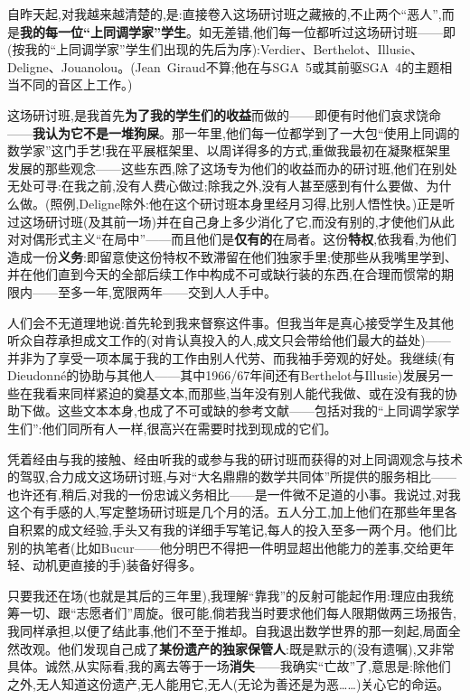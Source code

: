 自昨天起,对我越来越清楚的,是:直接卷入这场研讨班之藏掖的,不止两个“恶人”,而是\textbf{我的每一位“上同调学家”学生}。如无差错,他们每一位都听过这场研讨班——即(按我的“上同调学家”学生们出现的先后为序):Verdier、Berthelot、Illusie、Deligne、Jouanolou。(Jean~Giraud不算;他在与SGA~5或其前驱SGA~4的主题相当不同的音区上工作。)

这场研讨班,是我首先\textbf{为了我的学生们的收益}而做的——即便有时他们哀求饶命——\textbf{我认为它不是一堆狗屎}。那一年里,他们每一位都学到了一大包“使用上同调的数学家”这门手艺!我在平展框架里、以周详得多的方式,重做我最初在凝聚框架里发展的那些观念——这些东西,除了这场专为他们的收益而办的研讨班,他们在别处无处可寻:在我之前,没有人费心做过;除我之外,没有人甚至感到有什么要做、为什么做。(照例,Deligne除外:他在这个研讨班本身里经月习得,比别人悟性快。)正是听过这场研讨班(及其前一场)并在自己身上多少消化了它,而没有别的,才使他们从此对对偶形式主义“在局中”——而且他们是\textbf{仅有的}在局者。这份\textbf{特权},依我看,为他们造成一份\textbf{义务}:即留意使这份特权不致滞留在他们独家手里;使那些从我嘴里学到、并在他们直到今天的全部后续工作中构成不可或缺行装的东西,在合理而惯常的期限内——至多一年,宽限两年——交到人人手中。

\dmark{}人们会不无道理地说:首先轮到我来督察这件事。但我当年是真心接受学生及其他听众自荐承担成文工作的(对肯认真投入的人,成文只会带给他们最大的益处)——并非为了享受一项本属于我的工作由别人代劳、而我袖手旁观的好处。我继续(有Dieudonné的协助与其他人——其中1966/67年间还有Berthelot与Illusie)发展另一些在我看来同样紧迫的奠基文本,而那些,当年没有别人能代我做、或在没有我的协助下做。这些文本本身,也成了不可或缺的参考文献——包括对我的“上同调学家学生们”:他们同所有人一样,很高兴在需要时找到现成的它们。

凭着经由与我的接触、经由听我的或参与我的研讨班而获得的对上同调观念与技术的驾驭,合力成文这场研讨班,与对“大名鼎鼎的数学共同体”所提供的服务相比——也许还有,稍后,对我的一份忠诚义务相比——是一件微不足道的小事。我说过,对我这个有手感的人,写定整场研讨班是几个月的活。五人分工,加上他们在那些年里各自积累的成文经验,手头又有我的详细手写笔记,每人的投入至多一两个月。他们比别的执笔者(比如Bucur——他分明巴不得把一件明显超出他能力的差事,交给更年轻、动机更直接的手)装备好得多。

只要我还在场(也就是其后的三年里),我理解“靠我”的反射可能起作用:理应由我统筹一切、跟“志愿者们”周旋。很可能,倘若我当时要求他们每人限期做两三场报告,我同样承担,以便了结此事,他们不至于推却。\dmark{}自我退出数学世界的那一刻起,局面全然改观。他们发现自己成了\textbf{某份遗产的独家保管人}:既是默示的(没有遗嘱),又非常具体。诚然,从实际看,我的离去等于一场\textbf{消失}——我确实“亡故”了,意思是:除他们之外,无人知道这份遗产,无人能用它,无人(无论为善还是为恶……)关心它的命运。

